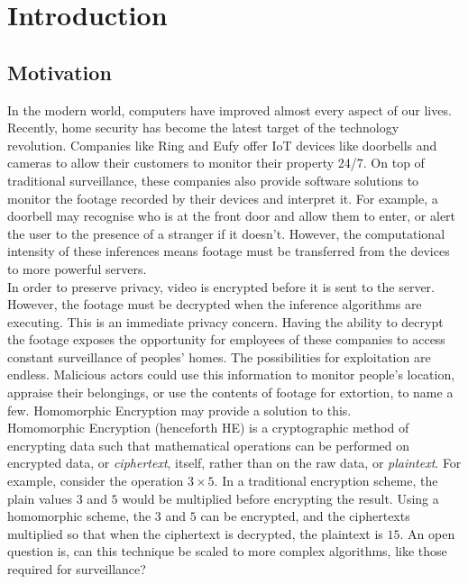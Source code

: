 \chapter{Introduction}
\label{chap:introduction}

\section{Motivation}
\label{sec:motivation}
\setlength{\leftskip}{0.25cm}
\indent \indent
In the modern world, computers have improved almost every aspect of our lives. Recently, home security has become the latest target of the technology revolution. Companies like Ring \cite{RING} and Eufy \cite{EUFY} offer IoT devices like doorbells and cameras to allow their customers to monitor their property 24/7. On top of traditional surveillance, these companies also provide software solutions to monitor the footage recorded by their devices and interpret it. For example, a doorbell may recognise who is at the front door and allow them to enter, or alert the user to the presence of a stranger if it doesn't. However, the computational intensity of these inferences means footage must be transferred from the devices to more powerful servers.
\smallskip \\ \indent
In order to preserve privacy, video is encrypted before it is sent to the server. However, the footage must be decrypted when the inference algorithms are executing. This is an immediate privacy concern. Having the ability to decrypt the footage exposes the opportunity for employees of these companies to access constant surveillance of peoples' homes. The possibilities for exploitation are endless. Malicious actors could use this information to monitor people's location, appraise their belongings, or use the contents of footage for extortion, to name a few. Homomorphic Encryption may provide a solution to this.
\smallskip \\ \indent
Homomorphic Encryption (henceforth HE) is a cryptographic method of encrypting data such that mathematical operations can be performed on encrypted data, or \textit{ciphertext}, itself, rather than on the raw data, or \textit{plaintext}. For example, consider the operation $3 \times 5$. In a traditional encryption scheme, the plain values $3$ and $5$ would be multiplied before encrypting the result. Using a homomorphic scheme, the $3$ and $5$ can be encrypted, and the ciphertexts multiplied so that when the ciphertext is decrypted, the plaintext is $15$. An open question is, can this technique be scaled to more complex algorithms, like those required for surveillance?
